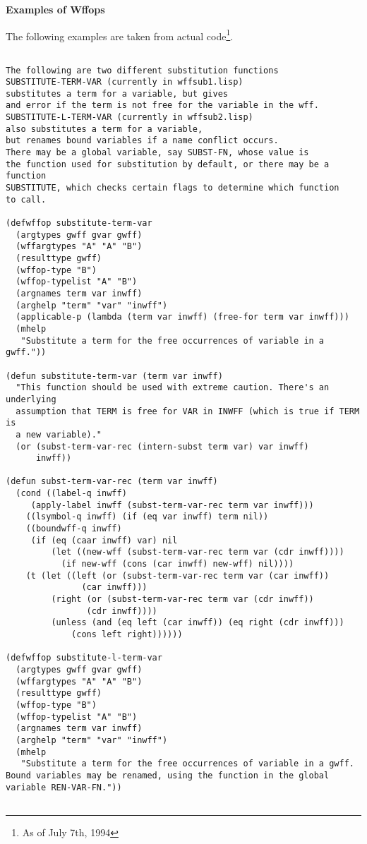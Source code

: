 \begin{center}
{\bf Examples of Wffops}
\end{center}

The following examples are taken from actual code\footnote{As of July 7th, 1994}.
\begin{verbatim}

The following are two different substitution functions
SUBSTITUTE-TERM-VAR (currently in wffsub1.lisp) 
substitutes a term for a variable, but gives
and error if the term is not free for the variable in the wff.
SUBSTITUTE-L-TERM-VAR (currently in wffsub2.lisp) 
also substitutes a term for a variable,
but renames bound variables if a name conflict occurs.
There may be a global variable, say SUBST-FN, whose value is
the function used for substitution by default, or there may be a function
SUBSTITUTE, which checks certain flags to determine which function
to call.

(defwffop substitute-term-var
  (argtypes gwff gvar gwff)
  (wffargtypes "A" "A" "B")
  (resulttype gwff)
  (wffop-type "B")
  (wffop-typelist "A" "B")
  (argnames term var inwff)
  (arghelp "term" "var" "inwff")
  (applicable-p (lambda (term var inwff) (free-for term var inwff)))
  (mhelp
   "Substitute a term for the free occurrences of variable in a gwff."))

(defun substitute-term-var (term var inwff)
  "This function should be used with extreme caution. There's an underlying
  assumption that TERM is free for VAR in INWFF (which is true if TERM is
  a new variable)."
  (or (subst-term-var-rec (intern-subst term var) var inwff)
      inwff))

(defun subst-term-var-rec (term var inwff)
  (cond ((label-q inwff)
	 (apply-label inwff (subst-term-var-rec term var inwff)))
	((lsymbol-q inwff) (if (eq var inwff) term nil))
	((boundwff-q inwff)
	 (if (eq (caar inwff) var) nil
	     (let ((new-wff (subst-term-var-rec term var (cdr inwff))))
	       (if new-wff (cons (car inwff) new-wff) nil))))
	(t (let ((left (or (subst-term-var-rec term var (car inwff))
			   (car inwff)))
		 (right (or (subst-term-var-rec term var (cdr inwff))
			    (cdr inwff))))
	     (unless (and (eq left (car inwff)) (eq right (cdr inwff)))
		     (cons left right))))))

(defwffop substitute-l-term-var
  (argtypes gwff gvar gwff)
  (wffargtypes "A" "A" "B")
  (resulttype gwff)
  (wffop-type "B")
  (wffop-typelist "A" "B")
  (argnames term var inwff)
  (arghelp "term" "var" "inwff")
  (mhelp
   "Substitute a term for the free occurrences of variable in a gwff.
Bound variables may be renamed, using the function in the global
variable REN-VAR-FN."))


\end{verbatim}
